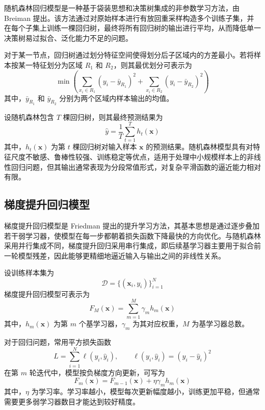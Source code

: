 随机森林回归模型是一种基于袋装思想和决策树集成的非参数学习方法，由 Breiman 提出\cite{intro:14}。该方法通过对原始样本进行有放回重采样构造多个训练子集，并在每个子集上训练一棵回归树，最终将所有回归树的输出进行平均，从而降低单一决策树易过拟合、泛化能力不足的问题。

对于某一节点，回归树通过划分特征空间使得划分后子区域内的方差最小。若将样本按某一特征划分为区域 $R_1$ 和 $R_2$，则其最优划分可表示为
\begin{equation}
  \min \left(
  \sum_{x_i \in R_1} \left(y_i - \bar{y}_{R_1}\right)^2 +
  \sum_{x_i \in R_2} \left(y_i - \bar{y}_{R_2}\right)^2
  \right)
\end{equation}
其中，$\bar{y}_{R_1}$ 和 $\bar{y}_{R_2}$ 分别为两个区域内样本输出的均值。

设随机森林包含 $T$ 棵回归树，则其最终预测结果为
\begin{equation}
  \hat{y} = \frac{1}{T}\sum_{t=1}^{T} h_t(\mathbf{x})
\end{equation}
其中，$h_t(\mathbf{x})$ 为第 $t$ 棵回归树对输入样本 $\mathbf{x}$ 的预测结果。随机森林模型具有对特征尺度不敏感、鲁棒性较强、训练稳定等优点，适用于处理中小规模样本上的非线性回归问题，但其输出通常表现为分段常值形式，对复杂平滑函数的逼近能力相对有限。

\subsection{梯度提升回归模型}

梯度提升回归模型是 Friedman 提出的提升学习方法\cite{intro:15}，其基本思想是通过逐步叠加若干弱学习器，使模型在每一步都朝着损失函数下降最快的方向优化。与随机森林采用并行集成不同，梯度提升回归采用串行集成，即后续基学习器主要用于拟合前一轮模型残差，因此能够更精细地逼近输入与输出之间的非线性关系。

设训练样本集为
\begin{equation}
  \mathcal{D} = \{(\mathbf{x}_i, y_i)\}_{i=1}^{N}
\end{equation}
梯度提升回归模型可表示为
\begin{equation}
  F_M(\mathbf{x}) = \sum_{m=1}^{M} \gamma_m h_m(\mathbf{x})
\end{equation}
其中，$h_m(\mathbf{x})$ 为第 $m$ 个基学习器，$\gamma_m$ 为其对应权重，$M$ 为基学习器总数。

对于回归问题，常用平方损失函数
\begin{equation}
  L = \sum_{i=1}^{N} \ell(y_i,\hat{y}_i),
  \qquad
  \ell(y_i,\hat{y}_i) = (y_i - \hat{y}_i)^2
\end{equation}
在第 $m$ 轮迭代中，模型按负梯度方向更新，可写为
\begin{equation}
  F_m(\mathbf{x}) = F_{m-1}(\mathbf{x}) + \eta \gamma_m h_m(\mathbf{x})
\end{equation}
其中，$\eta$ 为学习率。学习率越小，模型每次更新幅度越小，训练更加平稳，但通常需要更多弱学习器数目才能达到较好精度。

